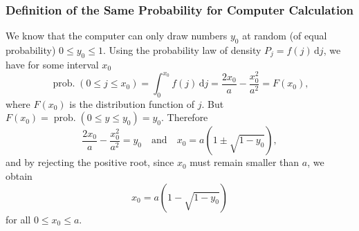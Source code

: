 \documentclass[letterpaper, 11pt]{article}
\begin{document}
\subsubsection*{Definition of the Same Probability for Computer Calculation}

We know that the computer can only draw numbers \( y_0 \) at random (of equal probability) \( 0 \leq
y_0 \leq 1 \). Using the probability law of density \( P_j = f(j) \, \mathrm{d}j \), we have for
some interval \( x_0 \)
\[ \operatorname{prob.}{(0 \leq j \leq x_0)} = \int_0^{x_0} f(j) \, \mathrm{d}j = \frac{2x_0}{a} -
\frac{x_0^2}{a^2} = F(x_0), \] where \( F(x_0) \) is the distribution function of \( j \). But \(
F(x_0) = \operatorname{prob.}{(0 \leq y \leq y_0)} = y_0 \). Therefore
\[ \frac{2x_0}{a} - \frac{x_0^2}{a^2} = y_0 \quad \text{and} \quad x_0 = a \left( 1 \pm \sqrt{1 -
y_0} \right), \] and by rejecting the positive root, since \( x_0 \) must remain smaller than \( a
\), we obtain
\[ x_0 = a \left( 1 - \sqrt{1 - y_0} \right) \] for all \( 0 \leq x_0 \leq a \).
\end{document}
